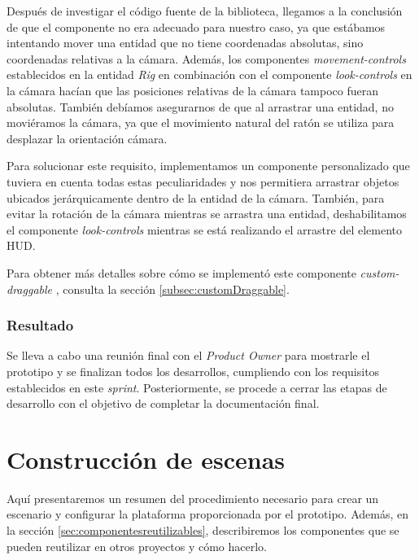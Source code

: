 \documentclass[a4paper, 11pt]{book}
\begin{document}
Después de investigar el código fuente de la biblioteca, llegamos a la conclusión de que el componente no era adecuado para nuestro caso, ya que estábamos intentando mover una entidad que no tiene coordenadas absolutas, sino coordenadas relativas a la cámara. 
Además, los componentes \emph{movement-controls} establecidos en la entidad \emph{Rig} en combinación con el componente \emph{look-controls} en la cámara hacían que las posiciones relativas de la cámara tampoco fueran absolutas. También debíamos asegurarnos de que al arrastrar una entidad, no moviéramos la cámara, ya que el movimiento natural del ratón se utiliza para desplazar la orientación cámara.

Para solucionar este requisito, implementamos un componente personalizado que tuviera en cuenta todas estas peculiaridades y nos permitiera arrastrar objetos ubicados jerárquicamente dentro de la entidad de la cámara. También, para evitar la rotación de la cámara mientras se arrastra una entidad, deshabilitamos el componente \emph{look-controls} mientras se está realizando el arrastre del elemento \textsc{\gls{HUD}}.

Para obtener más detalles sobre cómo se implementó este componente \emph{custom-draggable} , consulta la sección \ref{subsec:customDraggable}.

\subsubsection{Resultado}
Se lleva a cabo una reunión final con el \emph{Product Owner} para mostrarle el prototipo y se finalizan todos los desarrollos, cumpliendo con los requisitos establecidos en este \emph{sprint}. Posteriormente, se procede a cerrar las etapas de desarrollo con el objetivo de completar la documentación final. 

\section{Construcción de escenas}
Aquí presentaremos un resumen del procedimiento necesario para crear un escenario y configurar la plataforma proporcionada por el prototipo. Además, en la sección \ref{sec:componentesreutilizables}, describiremos los componentes que se pueden reutilizar en otros proyectos y cómo hacerlo.
\end{document}
